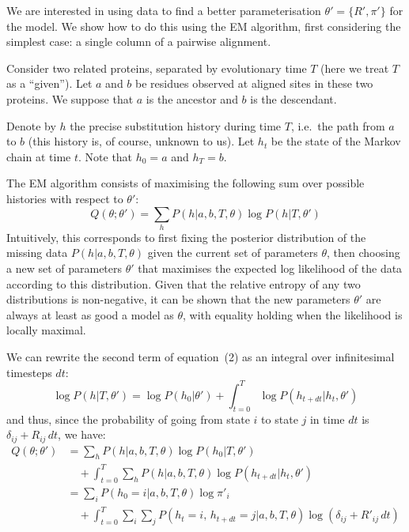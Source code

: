 \documentclass[12pt]{article}
\begin{document}
We are interested in using data to find a better parameterisation $\theta' = \{R', \pi'\}$ for the
model. We show how to do this using the EM algorithm, first considering the simplest case: a single
column of a pairwise alignment.

Consider two related proteins, separated by evolutionary time $T$ (here we treat $T$ as a
``given''). Let $a$ and $b$ be residues observed at aligned sites in these two proteins. We suppose
that $a$ is the ancestor and $b$ is the descendant.

Denote by $h$ the precise substitution history during time $T$, i.e.\ the path from $a$ to $b$
(this history is, of course, unknown to us). Let $h_t$ be the state of the Markov chain at time $t$.
Note that $h_0 = a$ and $h_T = b$.

The EM algorithm\cite{Dempster1977} consists of maximising the following sum over possible histories
with respect to $\theta'$:
\begin{equation}
Q(\theta; \theta') = \sum_h P(h | a, b, T, \theta) \log P(h | T, \theta')
\end{equation}
Intuitively, this corresponds to first fixing the posterior distribution of the missing data
$P(h | a, b, T, \theta)$ given the current set of parameters $\theta$, then choosing a new set of
parameters $\theta'$ that maximises the expected log likelihood of the data according to this
distribution. Given that the relative entropy of any two distributions is non-negative, it can be
shown that the new parameters $\theta'$ are always at least as good a model as $\theta$, with
equality holding when the likelihood is locally maximal.

We can rewrite the second term of equation~(2) as an integral over infinitesimal timesteps $dt$:
\begin{equation*}
\log P(h | T, \theta') = \log P(h_0 | \theta') + \int_{t=0}^{T} \log P(h_{t+dt} | h_t, \theta')
\end{equation*}
and thus, since the probability of going from state $i$ to state $j$ in time $dt$ is
$\delta_{ij} + R_{ij}\,dt$, we have:
\begin{align*}
Q(\theta; \theta') &= \sum_h P(h | a, b, T, \theta) \log P(h_0 | T, \theta') \\
&\quad + \int_{t=0}^{T} \sum_h P(h | a, b, T, \theta) \log P(h_{t+dt} | h_t, \theta') \\[6pt]
&= \sum_i P(h_0 = i | a, b, T, \theta) \log \pi'_i \\
&\quad + \int_{t=0}^{T} \sum_i \sum_j P(h_t = i,\, h_{t+dt} = j | a, b, T, \theta) \log(\delta_{ij} + R'_{ij}\,dt)
\end{align*}
\end{document}
